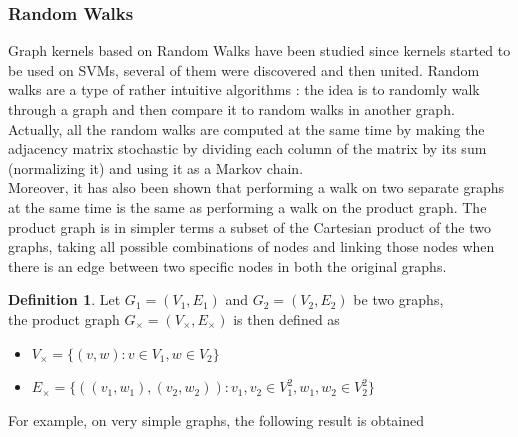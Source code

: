 \documentclass{article}
\theoremstyle{definition}
\newtheorem{definition}{Definition}
\begin{document}
\subsubsection{Random Walks}
Graph kernels based on Random Walks have been studied since kernels started to be used on SVMs\cite{kashima_graphkers_2003}, several of them were discovered and then united\cite{vishwanathan_graph_2010}. Random walks are a type of rather intuitive algorithms : the idea is to randomly walk through a graph and then compare it to random walks in another graph. Actually, all the random walks are computed at the same time by making the adjacency matrix stochastic by dividing each column of the matrix by its sum (normalizing it) and using it as a Markov chain.\\
Moreover, it has also been shown\cite{imrich2000product} that performing a walk on two separate graphs at the same time is the same as performing a walk on the product graph. The product graph is in simpler terms a subset of the Cartesian product of the two graphs, taking all possible combinations of nodes and linking those nodes when there is an edge between two specific nodes in both the original graphs. \\
\begin{definition}
	Let $G_1=(V_{1},E_{1})$ and $G_2=(V_{2},E_{2})$ be two graphs,\\the product graph
	$G_\times = (V_{\times},E_{\times})$ is then defined as
	\begin{itemize}
		\item $V_{\times} = \{(v,w) : v \in V_{1}, w \in V_{2} \}$
		\item $E_{\times} = \{((v_1,w_1),(v_2,w_2)) : v_1,v_2 \in V_{1}^2, w_1,w_2 \in V_{2}^2 \}$
	\end{itemize}
\end{definition}
For example, on very simple graphs, the following result is obtained
\end{document}
